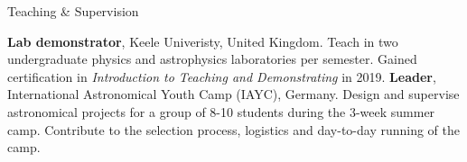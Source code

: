 \begin{rubric}{Teaching \& Supervision}

%
    \textbf{Lab demonstrator}, Keele Univeristy, United Kingdom. Teach in two undergraduate physics and astrophysics laboratories per semester. Gained certification in \emph{Introduction to Teaching and Demonstrating} in 2019.
%
    \textbf{Leader}, International Astronomical Youth Camp (IAYC), Germany. Design and supervise astronomical projects for a group of 8-10 students during the 3-week summer camp. Contribute to the selection process, logistics and day-to-day running of the camp.%
    
\end{rubric}